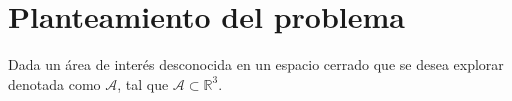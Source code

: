 \documentclass[sigconf]{acmart}
\begin{document}





\section{Planteamiento del problema}

Dada un área de interés desconocida en un espacio cerrado que se desea explorar denotada como $\mathcal{A}$, tal que $\mathcal{A} \subset \mathbb{R}^{3}$.\\
\end{document}
